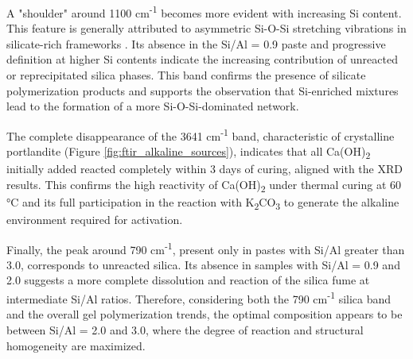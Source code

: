 A "shoulder" around 1100 cm\textsuperscript{-1} becomes more evident with increasing Si content.
This feature is generally attributed to asymmetric Si-O-Si stretching vibrations in silicate-rich frameworks \cite{ma2022calcium}.
Its absence in the Si/Al = 0.9 paste and progressive definition at higher Si contents indicate the increasing contribution of unreacted or reprecipitated silica phases.
This band confirms the presence of silicate polymerization products and supports the observation that Si-enriched mixtures lead to the formation of a more Si-O-Si-dominated network.

The complete disappearance of the 3641 cm\textsuperscript{-1} band, characteristic of crystalline portlandite (Figure \ref{fig:ftir_alkaline_sources}), indicates that all Ca(OH)\textsubscript{2} initially added reacted completely within 3 days of curing, aligned with the XRD results.
This confirms the high reactivity of Ca(OH)\textsubscript{2} under thermal curing at 60 °C and its full participation in the reaction with K\textsubscript{2}CO\textsubscript{3} to generate the alkaline environment required for activation.

Finally, the peak around 790 cm\textsuperscript{-1}, present only in pastes with Si/Al greater than 3.0, corresponds to unreacted silica.
Its absence in samples with Si/Al = 0.9 and 2.0 suggests a more complete dissolution and reaction of the silica fume at intermediate Si/Al ratios.
Therefore, considering both the 790 cm\textsuperscript{-1} silica band and the overall gel polymerization trends, the optimal composition appears to be between Si/Al = 2.0 and 3.0, where the degree of reaction and structural homogeneity are maximized.



